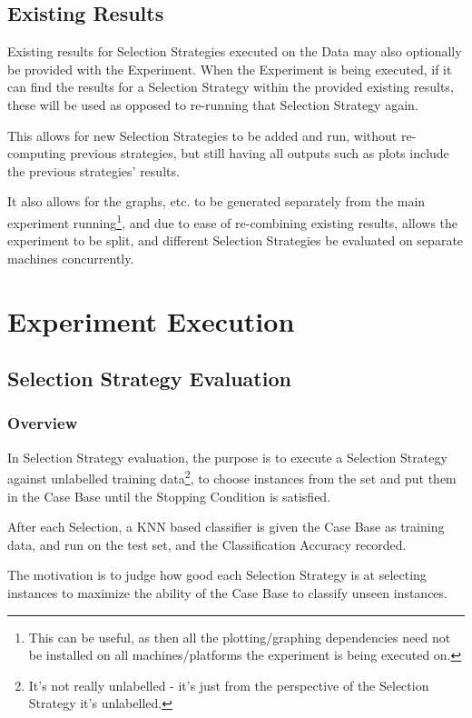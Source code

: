 \documentclass[a4paper,11pt]{report}
\begin{document}
\subsection{Existing Results}
Existing results for Selection Strategies executed on the Data may also optionally be provided with the Experiment. When the Experiment is being executed, if it can find the results for a Selection Strategy within the provided existing results, these will be used as opposed to re-running that Selection Strategy again.

This allows for new Selection Strategies to be added and run, without re-computing previous strategies, but still having all outputs such as plots include the previous strategies' results.

It also allows for the graphs, etc. to be generated separately from the main experiment running\footnote{This can be useful, as then all the plotting/graphing dependencies need not be installed on all machines/platforms the experiment is being executed on.}, and due to ease of re-combining existing results, allows the experiment to be split, and different Selection Strategies be evaluated on separate machines concurrently.

\section{Experiment Execution}

\subsection{Selection Strategy Evaluation}
\subsubsection{Overview}
In Selection Strategy evaluation, the purpose is to execute a Selection Strategy against unlabelled training data\footnote{It's not really unlabelled - it's just from the perspective of the Selection Strategy it's unlabelled.}, to choose instances from the set and put them in the Case Base until the Stopping Condition is satisfied.

After each Selection, a KNN based classifier is given the Case Base as training data, and run on the test set, and the Classification Accuracy recorded.

The motivation is to judge how good each Selection Strategy is at selecting instances to maximize the ability of the Case Base to classify unseen instances.
\end{document}

